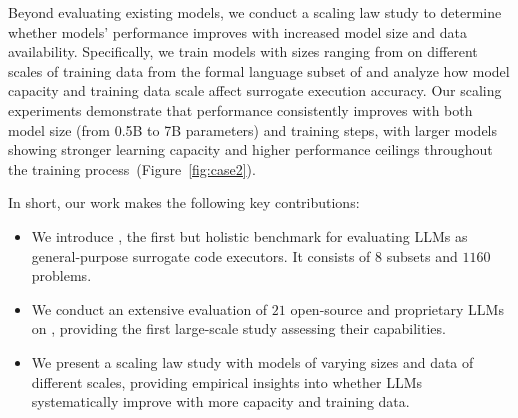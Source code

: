 Beyond evaluating existing models, we conduct a scaling law study to determine whether models' performance improves with increased model size and data availability. Specifically, we train models with sizes ranging from  on different scales of training data from the formal language subset of \bench and analyze how model capacity and training data scale affect surrogate execution accuracy. Our scaling experiments demonstrate that performance consistently improves with both model size (from 0.5B to 7B parameters) and training steps, with larger models showing stronger learning capacity and higher performance ceilings throughout the training process~(Figure~\ref{fig:case2}).

In short, our work makes the following key contributions:

\begin{itemize}
    \item We introduce \bench, the first but holistic benchmark for evaluating LLMs as general-purpose surrogate code executors. It consists of $8$ subsets and $1160$ problems.
    \item We conduct an extensive evaluation of $21$ open-source and proprietary LLMs on \bench, providing the first large-scale study assessing their capabilities.
    \item We present a scaling law study with models of varying sizes and data of different scales, providing empirical insights into whether LLMs systematically improve with more capacity and training data.
\end{itemize}